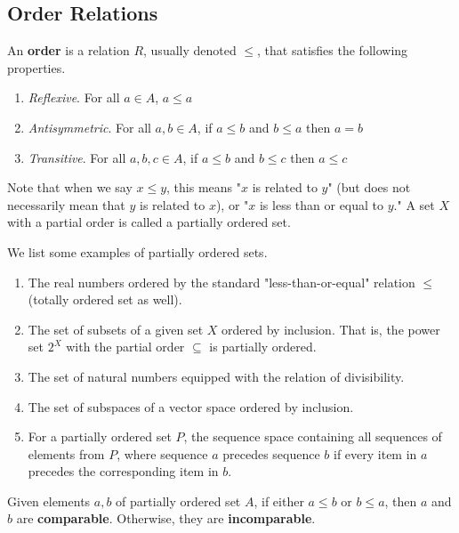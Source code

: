 \subsection{Order Relations} 
  
  \begin{definition}
    An \textbf{order} is a relation $R$, usually denoted $\leq$, that satisfies the following properties. 
    \begin{enumerate}
      \item \textit{Reflexive}. For all $a \in A$, $a \leq a$
      \item \textit{Antisymmetric}. For all $a,b \in A$, if $a \leq b$ and $b \leq a$ then $a=b$
      \item \textit{Transitive}. For all $a,b,c \in A$, if $a \leq b$ and $b \leq c$ then $a \leq c$
    \end{enumerate} 
    Note that when we say $x \leq y$, this means "$x$ is related to $y$" (but does not necessarily mean that $y$ is related to $x$), or "$x$ is less than or equal to $y$." A set $X$ with a partial order is called a partially ordered set. 
  \end{definition} 

  \begin{example}
    We list some examples of partially ordered sets. 
    \begin{enumerate}
      \item The real numbers ordered by the standard "less-than-or-equal" relation $\leq$ (totally ordered set as well). 
      \item The set of subsets of a given set $X$ ordered by inclusion. That is, the power set $2^X$ with the partial order $\subseteq$ is partially ordered. 
      \item The set of natural numbers equipped with the relation of divisibility. 
      \item The set of subspaces of a vector space ordered by inclusion. 
      \item For a partially ordered set $P$, the sequence space containing all sequences of elements from $P$, where sequence $a$ precedes sequence $b$ if every item in $a$ precedes the corresponding item in $b$. 
    \end{enumerate}
  \end{example} 

  \begin{definition}
    Given elements $a, b$ of partially ordered set $A$, if either $a \leq b$ or $b \leq a$, then $a$ and $b$ are \textbf{comparable}. Otherwise, they are \textbf{incomparable}. 
  \end{definition}

